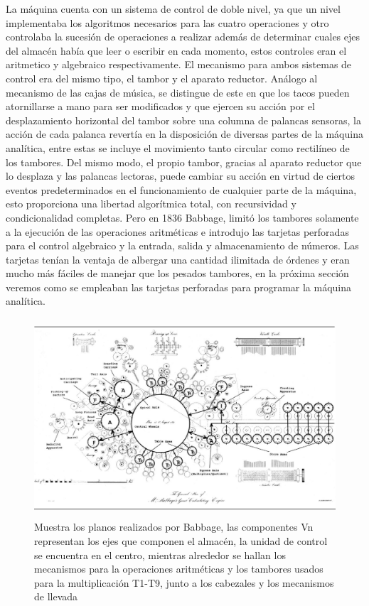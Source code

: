 \documentclass[runningheads,a4paper]{llncs}
\begin{document}
La máquina cuenta con un sistema de control de doble nivel, ya que un nivel implementaba los algoritmos necesarios
para las cuatro operaciones y otro controlaba la sucesión de operaciones a realizar además de determinar cuales 
ejes del almacén había que leer o escribir en cada momento, estos controles eran el aritmetico y algebraico 
respectivamente. El mecanismo para ambos sistemas de control era del mismo tipo, el tambor y el aparato reductor.
Análogo al mecanismo de las cajas de música, se distingue de este en que los tacos pueden atornillarse a mano para ser modificados y que ejercen su acción por el desplazamiento horizontal del tambor sobre una columna de palancas sensoras,
la acción de cada palanca revertía en la disposición de diversas partes de la máquina analítica, entre estas se incluye el movimiento tanto circular como rectilíneo de los tambores. Del mismo modo, el propio tambor, gracias al aparato reductor que lo desplaza y las palancas lectoras, puede cambiar su acción en virtud de ciertos eventos predeterminados en el funcionamiento de cualquier parte de la máquina, esto proporciona una libertad algorítmica total, con recursividad y condicionalidad completas. Pero en 1836 Babbage, limitó los tambores solamente a la ejecución de las operaciones aritméticas e introdujo las tarjetas perforadas para el control algebraico y la entrada, salida y almacenamiento de números. Las tarjetas tenían la ventaja de albergar una cantidad ilimitada de órdenes
y eran mucho más fáciles de manejar que los pesados tambores, en la próxima sección veremos como se empleaban las
tarjetas perforadas para programar la máquina analítica.

\begin{figure}
	\centering
	\includegraphics[height=7.4cm]{imgs/AMachine}
	\caption{Muestra los planos realizados por Babbage, las componentes Vn representan los ejes que componen el almacén, la unidad de control se encuentra en el centro, mientras alrededor se hallan los mecanismos para la operaciones aritméticas y los tambores usados para la multiplicación T1-T9, junto a los cabezales y los mecanismos de llevada}
	\label{fig:AM}
\end{figure}
\end{document}
